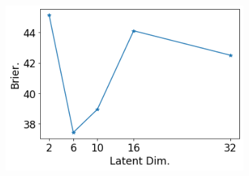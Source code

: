 \begin{figure}[ht]
\begin{subfigure}[t]{0.33 \textwidth}
        \includegraphics[width=1. \textwidth]{sections/006_neurips2020/figures/lat_dim_cifar10_brier.png}
    \end{subfigure}%


\end{figure}
